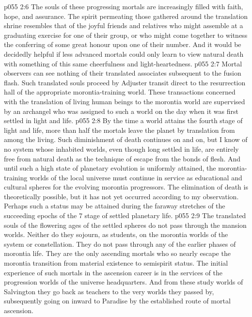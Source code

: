 \vs p055 2:6 The souls of these progressing mortals are increasingly filled with faith, hope, and assurance. The spirit permeating those gathered around the translation shrine resembles that of the joyful friends and relatives who might assemble at a graduating exercise for one of their group, or who might come together to witness the conferring of some great honour upon one of their number. And it would be decidedly helpful if less advanced mortals could only learn to view natural death with something of this same cheerfulness and light\hyp{}heartedness.
\vs p055 2:7 \pc Mortal observers can see nothing of their translated associates subsequent to the fusion flash. Such translated souls proceed by Adjuster transit direct to the resurrection hall of the appropriate morontia\hyp{}training world. These transactions concerned with the translation of living human beings to the morontia world are supervised by an archangel who was assigned to such a world on the day when it was first settled in light and life.
\vs p055 2:8 By the time a world attains the fourth stage of light and life, more than half the mortals leave the planet by translation from among the living. Such diminishment of death continues on and on, but I know of no system whose inhabited worlds, even though long settled in life, are entirely free from natural death as the technique of escape from the bonds of flesh. And until such a high state of planetary evolution is uniformly attained, the morontia\hyp{}training worlds of the local universe must continue in service as educational and cultural spheres for the evolving morontia progressors. The elimination of death is theoretically possible, but it has not yet occurred according to my observation. Perhaps such a status may be attained during the faraway stretches of the succeeding epochs of the 7 stage of settled planetary life.
\vs p055 2:9 \pc The translated souls of the flowering ages of the settled spheres do not pass through the mansion worlds. Neither do they sojourn, as students, on the morontia worlds of the system or constellation. They do not pass through any of the earlier phases of morontia life. They are the only ascending mortals who so nearly escape the morontia transition from material existence to semispirit status. The initial experience of such  mortals in the ascension career is in the services of the progression worlds of the universe headquarters. And from these study worlds of Salvington they go back as teachers to the very worlds they passed by, subsequently going on inward to Paradise by the established route of mortal ascension.
